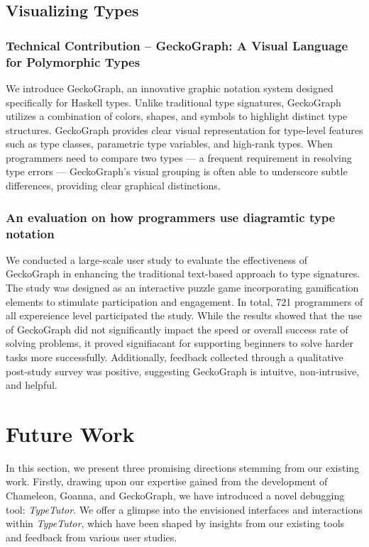 \subsection{Visualizing Types}

\subsubsection{Technical Contribution -- GeckoGraph: A Visual Language for Polymorphic Types}

We introduce GeckoGraph, an innovative graphic notation system designed specifically for Haskell types. Unlike traditional type signatures, GeckoGraph utilizes a combination of colors, shapes, and symbols to highlight distinct type structures. GeckoGraph provides clear visual representation for type-level features such as type classes, parametric type variables, and high-rank types. When programmers need to compare two types — a frequent requirement in resolving type errors — GeckoGraph's visual grouping is often able to underscore subtle differences, providing clear graphical distinctions.

\subsubsection{An evaluation on how programmers use diagramtic type notation}

We conducted a large-scale user study to evaluate the effectiveness of GeckoGraph in enhancing the traditional text-based approach to type signatures. The study was designed as an interactive puzzle game incorporating gamification elements to stimulate participation and engagement. In total,  721 programmers of all expereience level participated the study. While the results showed that the use of GeckoGraph did not significantly impact the speed or overall success rate of solving problems, it proved signifiacant for supporting beginners to solve harder tasks more successfully. Additionally, feedback collected through a qualitative post-study survey was  positive, suggesting GeckoGraph is intuitve, non-intrusive, and helpful.

\section{Future Work}

In this section, we present three promising directions stemming from our existing work. Firstly, drawing upon our expertise gained from the development of Chameleon, Goanna, and GeckoGraph, we have introduced a novel debugging tool: \textit{TypeTutor}. We offer a glimpse into the envisioned interfaces and interactions within \textit{TypeTutor}, which have been shaped by insights from our existing tools and feedback from various user studies.

